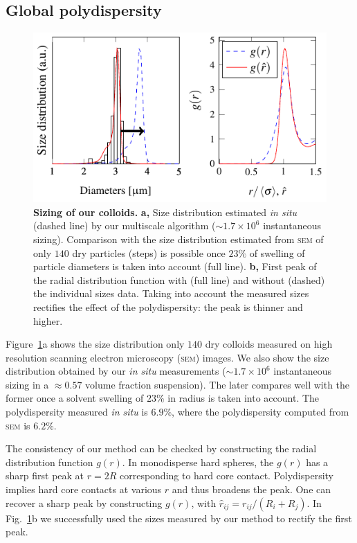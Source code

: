 \documentclass[8.5pt,twoside,twocolumn]{article}
\begin{document}
\subsection*{Global polydispersity}

\begin{figure}
\centering
\includegraphics{fig_sizing.pdf}
	\caption{\textbf{Sizing of our colloids.} \textbf{a,} Size distribution estimated \emph{in situ} (dashed line) by our multiscale algorithm ($\sim 1.7\times 10^6$ instantaneous sizing). Comparison with the size distribution estimated from \textsc{sem} of only $140$ dry particles (steps) is possible once $23\%$ of swelling of particle diameters is taken into account (full line). \textbf{b,} First peak of the radial distribution function with (full line) and without (dashed) the individual sizes data. Taking into account the measured sizes rectifies the effect of the polydispersity: the peak is thinner and higher.}
	\label{fig:sizing}
\end{figure}

Figure~\ref{fig:sizing}a shows the size distribution only $140$ dry colloids measured on high resolution scanning electron microscopy (\textsc{sem}) images. We also show the size distribution obtained by our \emph{in situ} measurements ($\sim 1.7\times 10^6$ instantaneous sizing in a $\approx 0.57$ volume fraction suspension). The later compares well with the former once a solvent swelling of $23\%$ in radius is taken into account. The polydispersity measured \emph{in situ} is $6.9\%$, where the polydispersity computed from \textsc{sem} is $6.2\%$.

The consistency of our method can be checked by constructing the radial distribution function $g(r)$. In monodisperse hard spheres, the $g(r)$ has a sharp first peak at $r=2R$ corresponding to hard core contact. Polydispersity implies hard core contacts at various $r$ and thus broadens the peak. One can recover a sharp peak by constructing $g(\hat{r})$, with $\hat{r}_{ij} = r_{ij}/(R_i+R_j)$. In Fig.~\ref{fig:sizing}b we successfully used the sizes measured by our method to rectify the first peak.
\end{document}

